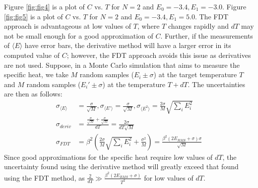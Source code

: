 \documentclass{article}
\begin{document}
\problem
Figure \ref{fig:fig4} is a plot of $C$ vs. $T$  for $N = 2$ and $E_0 = -3.4, E_1 = -3.0$. Figure \ref{fig:fig5} is a plot of $C$ vs. $T$  for $N = 2$ and $E_0 = -3.4, E_1 = 5.0$. The FDT approach is advantageous at low values of $T$, where $T$ changes rapidly and $dT$ may not be small enough for a good approximation of $C$. Further, if the measurements of $\langle E \rangle$ have error bars, the derivative method will have a larger error in its computed value of $C$; however, the FDT approach avoids this issue as derivatives are not used. Suppose, in a Monte Carlo simulation that aims to measure the specific heat, we take $M$ random samples ($E_i \pm \sigma$) at the target temperature $T$ and $M$ random samples ($E_i' \pm \sigma$) at the temperature $T + dT$. The uncertainties are then as follows:
\begin{equation}
    \begin{split}
        \sigma_{\langle E \rangle} & = \frac{\sigma}{\sqrt{M}}, \sigma_{\langle E' \rangle} = \frac{\sigma}{\sqrt{M}},
        \sigma_{\langle E^2 \rangle}  = \frac{2\sigma}{M}\sqrt{\sum_i E_i^2} \\
        \sigma_{deriv} & = \frac{\frac{\sigma}{\sqrt{M}} + \frac{\sigma}{\sqrt{M}}}{dT} = \frac{2\sigma}{dT\sqrt{M}} \\
        \sigma_{FDT} & = \beta^2\left(\frac{2\sigma}{M}\sqrt{\sum_i E_i^2} + \frac{\sigma^2}{M}\right) = \frac{\beta^2(2E_{RMS} + \sigma)\sigma}{\sqrt{M}}
    \end{split}
\end{equation}
Since good approximations for the specific heat require low values of $dT$, the uncertainty found using the derivative method will greatly exceed that found using the FDT method, as $\frac{2}{dT} \gg \frac{\beta^2\left(2E_{RMS} + \sigma\right)}{T^2}$ for low values of $dT$.
\end{document}
